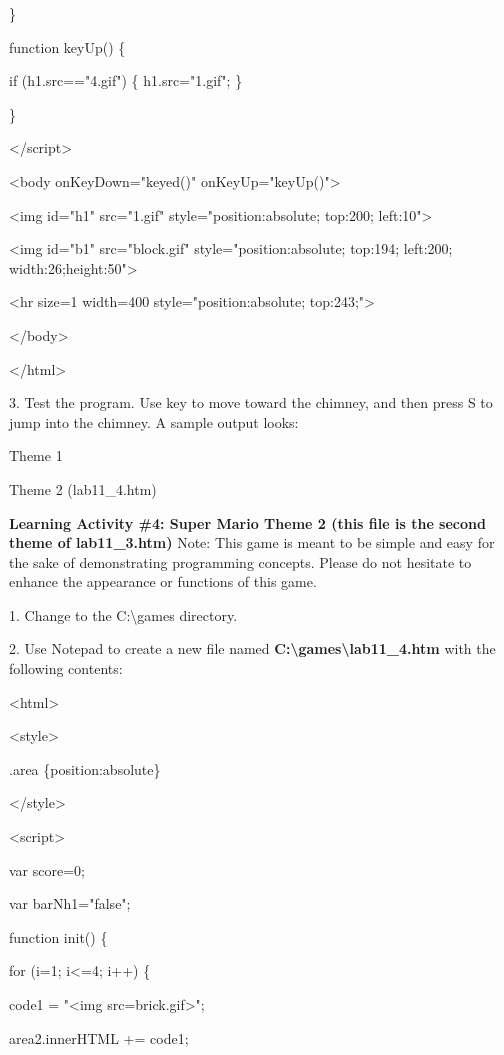 \documentclass[
]{article}
\begin{document}
\}

function keyUp() \{

if (h1.src=="4.gif") \{ h1.src="1.gif"; \}

\}

\textless/script\textgreater{}

\textless body onKeyDown="keyed()" onKeyUp="keyUp()"\textgreater{}

\textless img id="h1" src="1.gif" style="position:absolute; top:200;
left:10"\textgreater{}

\textless img id="b1" src="block.gif" style="position:absolute; top:194;
left:200; width:26;height:50"\textgreater{}

\textless hr size=1 width=400 style="position:absolute;
top:243;"\textgreater{}

\textless/body\textgreater{}

\textless/html\textgreater{}

3. Test the program. Use key to move toward the chimney, and then press
S to jump into the chimney. A sample output looks:

Theme 1

Theme 2 (lab11\_4.htm)

\textbf{Learning Activity \#4: Super Mario Theme 2 (this file is the
second theme of lab11\_3.htm)} Note: This game is meant to be simple and
easy for the sake of demonstrating programming concepts. Please do not
hesitate to enhance the appearance or functions of this game.

1. Change to the C:\textbackslash games directory.

2. Use Notepad to create a new file named
\textbf{C:\textbackslash games\textbackslash lab11\_4.htm} with the
following contents:

\textless html\textgreater{}

\textless style\textgreater{}

.area \{position:absolute\}

\textless/style\textgreater{}

\textless script\textgreater{}

var score=0;

var barNh1="false";

function init() \{

for (i=1; i\textless=4; i++) \{

code1 = "\textless img
src=\textquotesingle brick.gif\textquotesingle\textgreater";

area2.innerHTML += code1;
\end{document}
